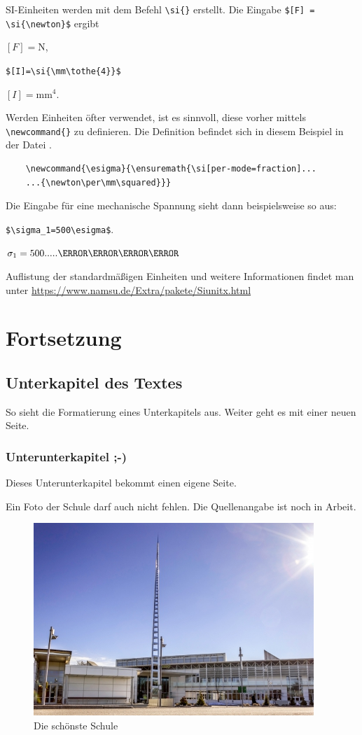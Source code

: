 SI-Einheiten werden mit dem Befehl \verb|\si{}| erstellt. Die Eingabe \verb|$[F] = \si{\newton}$| ergibt 

$[F] = \si{\newton}$,

\verb|$[I]=\si{\mm\tothe{4}}$|

$[I]=\si{\mm\tothe{4}}$.

Werden Einheiten öfter verwendet, ist es sinnvoll, diese vorher mittels \verb|\newcommand{}| zu definieren.
 Die Definition befindet sich in diesem Beispiel in der Datei . 
 
\begin{verbatim}
	\newcommand{\esigma}{\ensuremath{\si[per-mode=fraction]...
	...{\newton\per\mm\squared}}}
\end{verbatim}

Die Eingabe für eine mechanische Spannung sieht dann beispielsweise so aus:

\verb|$\sigma_1=500\esigma$|.

$\sigma_1=500\esigma$ 

Auflistung der standardmäßigen Einheiten und weitere Informationen findet man unter \url{https://www.namsu.de/Extra/pakete/Siunitx.html}


\section{Fortsetzung}

\subsection{Unterkapitel des Textes}
So sieht die Formatierung eines Unterkapitels aus.
Weiter geht es mit einer neuen Seite.

\newpage

\subsubsection{Unterunterkapitel ;-)}
Dieses Unterunterkapitel bekommt einen eigene Seite.

Ein Foto der Schule darf auch nicht fehlen. Die Quellenangabe ist noch in Arbeit.


	
\begin{figure}[htb]
	\centering
	\includegraphics[width=0.8\linewidth]{images/thumb-htlkaindorf_1-bf57c0aa8b00a13c9a8b98cc8bea49f0.jpg}
	\caption{Die schönste Schule}
	\label{fig:diag1}
\end{figure}

